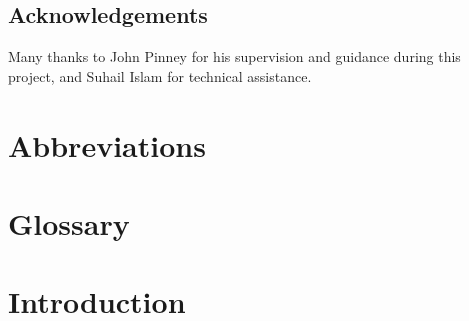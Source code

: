 \documentclass[12pt,a4paper]{article}
\begin{document}
\newpage
\begin{center}
\section*{Acknowledgements}
\doublespacing
Many thanks to John Pinney for his supervision and guidance during this project, and Suhail Islam for technical assistance.
\end{center}
\newpage
\tableofcontents
\newpage
\section*{Abbreviations}
\doublespacing

\newpage
\section*{Glossary}
\label{sec:glossary}
\doublespacing













\newpage
\section{Introduction}
\label{sec:intro}






\end{document}
